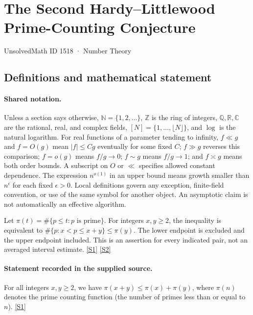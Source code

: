 \documentclass[11pt,a4paper]{article}
\newcommand{\N}{\mathbb{N}}
\newcommand{\Z}{\mathbb{Z}}
\newcommand{\Q}{\mathbb{Q}}
\newcommand{\R}{\mathbb{R}}
\newcommand{\C}{\mathbb{C}}
\newcommand{\sref}[2]{\hyperlink{source:#1:#2}{[S#2]}}
\begin{document}

\setcounter{section}{1517}

\section{The Second Hardy--Littlewood Prime-Counting Conjecture}\label{1518}

{\small\sffamily UnsolvedMath ID 1518 · Number Theory}

\subsection{Definitions and mathematical statement}

\paragraph{Shared notation.}Unless a section says otherwise, $\N=\{1,2,\ldots\}$,
$\Z$ is the ring of integers, $\Q,\R,\C$ are the rational, real, and complex
fields, $[N]=\{1,\ldots,\lfloor N\rfloor\}$, and $\log$ is the natural
logarithm. For real functions of a parameter tending to infinity,
$f\ll g$ and $f=O(g)$ mean $|f|\leq Cg$ eventually for some fixed $C$;
$f\gg g$ reverses this comparison; $f=o(g)$ means $f/g\to0$;
$f\sim g$ means $f/g\to1$; and $f\asymp g$ means both order bounds.
A subscript on $O$ or $\ll$ specifies allowed constant dependence.
The expression $n^{o(1)}$ in an upper bound means growth smaller than
$n^\epsilon$ for each fixed $\epsilon>0$. Local definitions govern any
exception, finite-field convention, or use of the same symbol for another
object. An asymptotic claim is not automatically an effective algorithm.



Let $\pi(t)=\#\{p\leq t:p\text{ is prime}\}$. For integers $x,y\geq2$, the inequality is equivalent to $\#\{p:x<p\leq x+y\}\leq\pi(y)$. The lower endpoint is excluded and the upper endpoint included. This is an assertion for every indicated pair, not an averaged interval estimate. \sref{1518}{1} \sref{1518}{2}

\paragraph{Statement recorded in the supplied source.}
For all integers $x, y \geq 2$, we have $\pi(x+y) \leq \pi(x) + \pi(y)$, where $\pi(n)$ denotes the prime counting function (the number of primes less than or equal to $n$). \sref{1518}{1}
\end{document}
